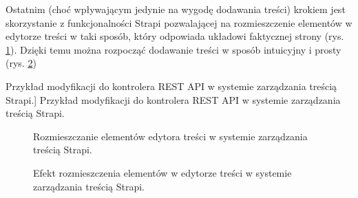 \documentclass[12pt]{article}
\numberwithin{figure}{section}
\begin{document}
\begin{sloppypar}
Ostatnim (choć wpływającym jedynie na wygodę dodawania treści) krokiem jest skorzystanie z funkcjonalności Strapi pozwalającej na rozmieszczenie elementów w edytorze treści w taki sposób, który odpowiada układowi faktycznej strony (rys. \ref{fig:strapi-interface-3.jpg}). Dzięki temu można rozpocząć dodawanie treści w sposób intuicyjny i prosty (rys. \ref{fig:strapi-interface-4.jpg})

\begin{code}[htbp]
    
    \caption
    [Przykład modyfikacji do kontrolera REST API w systemie zarządzania treścią Strapi.]
    {Przykład modyfikacji do kontrolera REST API w systemie zarządzania treścią Strapi.}
    \label{chapter4:controller}
\end{code}

\begin{figure}[H] 
    \centering
   \caption{Rozmieszczanie elementów edytora treści w systemie zarządzania treścią Strapi.}
   \label{fig:strapi-interface-3.jpg}
\end{figure}

\begin{figure}[H] 
    \centering
   \caption{Efekt rozmieszczenia elementów w edytorze treści w systemie zarządzania treścią Strapi.}
   \label{fig:strapi-interface-4.jpg}
\end{figure}



\end{sloppypar}
\end{document}
